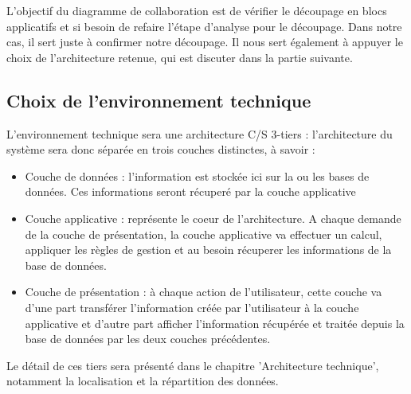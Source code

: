 L'objectif du diagramme de collaboration est de vérifier le découpage en blocs applicatifs et si besoin de refaire l'étape d'analyse pour le découpage. Dans notre cas, il sert juste à confirmer notre découpage. Il nous sert également à appuyer le choix de l'architecture retenue, qui est discuter dans la partie suivante.


\subsection{Choix de l'environnement technique}
L'environnement technique sera une architecture C/S 3-tiers : l'architecture du système sera donc séparée en trois couches distinctes, à savoir :
\begin{itemize}
\item Couche de données : l'information est stockée ici sur la ou les bases de données. Ces informations seront récuperé par la couche applicative
\item Couche applicative : représente le coeur de l'architecture. A chaque demande de la couche de présentation, la couche applicative va effectuer un calcul, appliquer les règles de gestion et au besoin récuperer les informations de la base de données.
\item Couche de présentation : à chaque action de l'utilisateur, cette couche va d'une part transférer l'information créée par l'utilisateur à la couche applicative et d'autre part afficher l'information récupérée et traitée depuis la base de données par les deux couches précédentes.
\end{itemize}
Le détail de ces tiers sera présenté dans le chapitre 'Architecture technique', notamment la localisation et la répartition des données.
